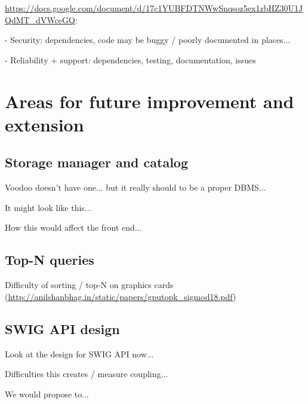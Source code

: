 \url{https://docs.google.com/document/d/17c1YUBFDTNWwSnqsoz5ex1zbHZ30U1JQdMT_dVWceGQ}:

- Security: dependencies, code may be buggy / poorly documented in places...

- Reliability + support: dependencies, testing, documentation, issues

\section{Areas for future improvement and extension}

\subsection{Storage manager and catalog}

Voodoo doesn't have one... but it really should to be a proper DBMS...

It might look like this...

How this would affect the front end...

\subsection{Top-N queries}

Difficulty of sorting / top-N on graphics cards (\url{http://anilshanbhag.in/static/papers/gputopk_sigmod18.pdf})

\subsection{SWIG API design}

Look at the design for SWIG API now...

Difficulties this creates / measure coupling...

We would propose to...
